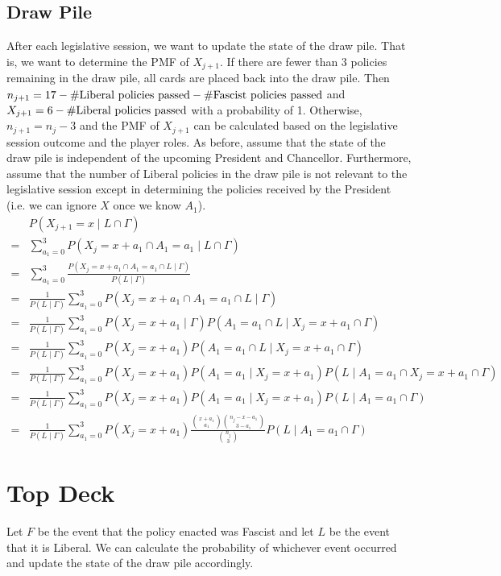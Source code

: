 \documentclass[fleqn, 12pt, letterpaper]{article}
\begin{document}
\subsection{Draw Pile}
After each legislative session, we want to update the state of the draw pile. That is, we want to determine the PMF of $X_{j+1}$. If there are fewer than 3 policies remaining in the draw pile, all cards are placed back into the draw pile. Then $n_{j+1} = 17 - \textnormal{\#Liberal policies passed} - \textnormal{\#Fascist policies passed}$ and $X_{j+1} = 6 - \textnormal{\#Liberal policies passed}$ with a probability of 1. Otherwise, $n_{j+1} = n_j - 3$ and the PMF of $X_{j+1}$ can be calculated based on the legislative session outcome and the player roles. As before, assume that the state of the draw pile is independent of the upcoming President and Chancellor. Furthermore, assume that the number of Liberal policies in the draw pile is not relevant to the legislative session except in determining the policies received by the President (i.e. we can ignore $X$ once we know $A_1$).
\begin{align*}
	& P(X_{j+1}=x \mid L \cap \Gamma) \\
	={}& \sum_{a_1=0}^3 P(X_j=x+a_1 \cap A_1=a_1 \mid L \cap \Gamma) \\
	={}& \sum_{a_1=0}^3 \frac{P(X_j=x+a_1 \cap A_1=a_1 \cap L \mid \Gamma)}{P(L \mid \Gamma)} \\
	={}& \frac{1}{P(L \mid \Gamma)} \sum_{a_1=0}^3 P(X_j=x+a_1 \cap A_1=a_1 \cap L \mid \Gamma) \\
	={}& \frac{1}{P(L \mid \Gamma)} \sum_{a_1=0}^3 P(X_j=x+a_1 \mid \Gamma) P(A_1=a_1 \cap L \mid X_j=x+a_1 \cap \Gamma) \\
	={}& \frac{1}{P(L \mid \Gamma)} \sum_{a_1=0}^3 P(X_j=x+a_1) P(A_1=a_1 \cap L \mid X_j=x+a_1 \cap \Gamma) \\
	={}& \frac{1}{P(L \mid \Gamma)} \sum_{a_1=0}^3 P(X_j=x+a_1) P(A_1=a_1 \mid X_j=x+a_1) P(L \mid A_1=a_1 \cap X_j=x+a_1 \cap \Gamma) \\
	={}& \frac{1}{P(L \mid \Gamma)} \sum_{a_1=0}^3 P(X_j=x+a_1) P(A_1=a_1 \mid X_j=x+a_1) P(L \mid A_1=a_1 \cap \Gamma) \\
	={}& \frac{1}{P(L \mid \Gamma)} \sum_{a_1=0}^3 P(X_j=x+a_1) \frac{\binom{x+a_1}{a_1} \binom{n_j-x-a_1}{3-a_1}}{\binom{n_j}{3}} P(L \mid A_1=a_1 \cap \Gamma)
\end{align*}

\newpage
\section{Top Deck}
Let $F$ be the event that the policy enacted was Fascist and let $L$ be the event that it is Liberal. We can calculate the probability of whichever event occurred and update the state of the draw pile accordingly.
\end{document}

